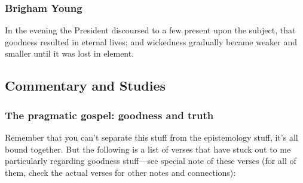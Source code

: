 	
	
	\subsubsection{Brigham Young} %
		\label{GOODNESS-BY}
	
		\begin{compactdesc}
			\item[{\hyperref[EMS-1860-BY-02-FEB-1860]{2 February 1860}}] In the evening the President discoursed to a few present upon the subject, that goodness resulted in eternal lives; and wickedness gradually became weaker and smaller until it was lost in element.
		\end{compactdesc}
	
\subsection{Commentary and Studies} %
	\label{GOODNESS-COMMENTARY}

	
		
	\subsubsection{The pragmatic gospel: goodness and truth}
		\label{GOODNESS-truth}
		
		Remember that you can't separate this stuff from the epistemology stuff, it's all bound together. But the following is a list of verses that have stuck out to me particularly regarding goodness stuff---see special note of these verses (for all of them, check the actual verses for other notes and connections):
		
